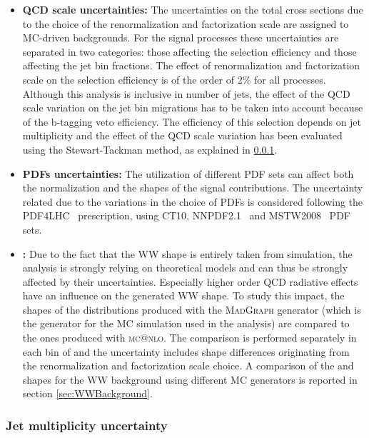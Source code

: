 \begin{itemize}

\item {\bf QCD scale uncertainties:}
  The uncertainties on the total cross sections due to the choice of the renormalization and factorization scale are assigned to MC-driven backgrounds.
  For the signal processes these uncertainties are separated in two categories: those affecting the selection efficiency and those affecting the jet bin fractions.
  The effect of renormalization and factorization scale on the selection efficiency is of the order of 2\% for all processes.
  Although this analysis is inclusive in number of jets, the effect of the QCD scale variation on the jet bin migrations has to be taken into account because of the b-tagging veto efficiency. The efficiency of this selection depends on jet multiplicity and the effect of the QCD scale variation has been evaluated using the Stewart-Tackman method, as explained in \ref{subsec:stewart-tackman}.

\item {\bf PDFs uncertainties:} 
  The utilization of different PDF sets can affect both the normalization and the shapes of the signal contributions. The uncertainty related due to the variations in the choice of PDFs is considered following the PDF4LHC~\cite{Alekhin:2011sk,Botje:2011sn} prescription, using CT10, NNPDF2.1~\cite{Ball:2011mu} and MSTW2008~\cite{Martin:2009iq} PDF sets.


\item {\bf {}:} 
  Due to the fact that the WW shape is entirely taken from simulation, the analysis is strongly
  relying on theoretical models and can thus be strongly affected by their uncertainties. Especially higher order QCD radiative effects have an influence on the generated WW shape. To study this impact, the shapes of the distributions produced with the \textsc{MadGraph} generator (which is the generator for the MC simulation used in the analysis) are compared to the ones produced with \textsc{mc@nlo}. The comparison is performed separately in each bin of \pth and the uncertainty includes shape differences originating from the renormalization and factorization scale choice. A comparison of the \mll and \mt shapes for the WW background using different MC generators is reported in section \ref{sec:WWBackground}.
\end{itemize} 

\subsubsection{Jet multiplicity uncertainty} \label{subsec:stewart-tackman}

